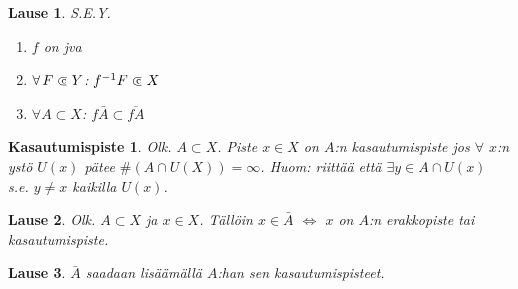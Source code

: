 \documentclass[landscape,a4paper,10pt]{article}
\newcommand\cls{\mathrel{\ooalign{$\subset$\cr
\hidewidth\raise.225ex\hbox{$\text{{\scriptsize c}}\mkern2mu$}\cr}}}
\theoremstyle{customtheoremstyle}
\newtheorem*{theorem}{Lause}
\begin{document}
\begin{multicols*}{3}
\begin{theorem}
  S.E.Y.
  \begin{enumerate}
    \item[(1)]{$f$ on jva}
    \item[(2)]{$\forall \, F \cls Y$: $f^{-1} F \cls X$ }
    \item[(3)]{$\forall A \subset X$: $f \bar{A} \subset \overline{f A}$}
  \end{enumerate}
\end{theorem}

\newtheorem*{kasautumispiste}{Kasautumispiste}
\begin{kasautumispiste}
  Olk. $A \subset X$. Piste $x \in X$ on $A$:n kasautumispiste jos $\forall$
  $x$:n ystö $U(x)$ pätee $\#(A \cap U(X)) = \infty$. Huom: riittää että
  $\exists y \in A \cap U(x) $ s.e. $y \neq x$ kaikilla $U(x)$.
\end{kasautumispiste}

\begin{theorem}
  Olk. $A \subset X$ ja $x \in X$. Tällöin $x \in \bar{A}$ $\iff$ $x$ on $A$:n
  erakkopiste tai kasautumispiste.
\end{theorem}

\begin{theorem}
  $\bar{A}$ saadaan lisäämällä $A$:han sen kasautumispisteet.
\end{theorem}

\end{multicols*}
\end{document}
